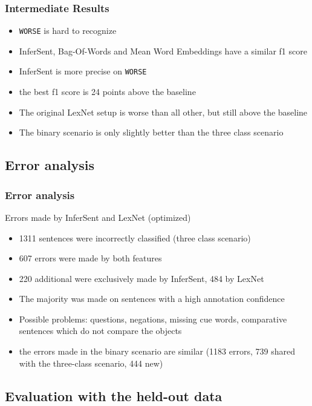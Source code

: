 \documentclass[11pt,aspectratio=169]{beamer}
\begin{document}
    \begin{frame}
        \frametitle{Intermediate Results}
        \begin{itemize}
            \item \texttt{WORSE} is hard to recognize
            \item InferSent, Bag-Of-Words and Mean Word Embeddings have a similar f1 score
            \item InferSent is more precise on \texttt{WORSE}
            \item the best f1 score is 24 points above the baseline
            \item The original LexNet setup is worse than all other, but still above the baseline
            \item The binary scenario is only slightly better than the three class scenario
        \end{itemize}
    \end{frame}

    \subsection{Error analysis}
    \begin{frame}
        \frametitle{Error analysis}
        Errors made by InferSent and LexNet (optimized)
        \begin{itemize}
            \item 1311 sentences were incorrectly classified (three class scenario)
            \item 607 errors were made by both features
            \item 220 additional were exclusively made by InferSent, 484 by LexNet
            \item The majority was made on sentences with a high annotation confidence
            \item Possible problems: questions, negations, missing cue words, comparative sentences which do not compare the objects
            \item the errors made in the binary scenario are similar (1183 errors, 739 shared with the three-class scenario, 444 new)
        \end{itemize}

    \end{frame}
    \subsection{Evaluation with the held-out data}
    \frame{\subsectionpage}
\end{document}
